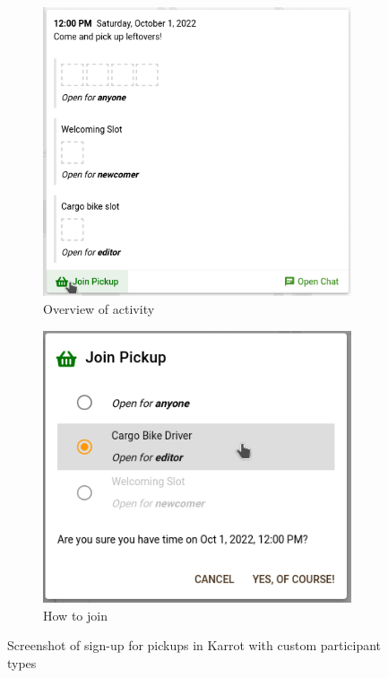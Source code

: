\documentclass[
	a4paper,%
	11pt,%
	]{article}
\begin{document}
\begin{figure}[!h]
\centering
\begin{subfigure}{0.55\textwidth}
\centering
\includegraphics[width = \textwidth]{images/screenshot_pick-ups_roles.png}
\caption{Overview of activity}
\end{subfigure}
\begin{subfigure}{0.44\textwidth}
\centering
\includegraphics[width = \textwidth]{images/screenshot_pick-ups_roles_join.png}
\caption{How to join}
\end{subfigure}
\caption{Screenshot of sign-up for pickups in Karrot with custom participant types}
\label{fig:screenshot-pickup-roles}
\end{figure}
\end{document}
